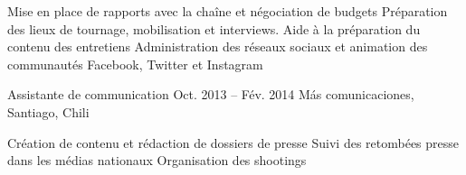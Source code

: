 \begin{joblist}
{		\iftbftiny \vspace{-0.5cm} \fi
			\begin{itemize}
			  \iftbftiny \setlength\itemsep{-3pt} \fi
			  \cvitem[\checkmark] Mise en place de rapports avec la chaîne et négociation de budgets                       
			  \cvitem[\checkmark] Préparation des lieux de tournage, mobilisation et interviews. Aide à la préparation du contenu des entretiens 
			  \cvitem[\checkmark] Administration des réseaux sociaux et animation des communautés Facebook, Twitter et Instagram                
			\end{itemize}     
			
	}



\item[Assistante de communication]{Oct. 2013 -- Fév. 2014 }     
  	{Más comunicaciones, Santiago, Chili}     
  	{

		\iftbftiny \vspace{-0.5cm} \fi
		\begin{itemize}
			  \iftbftiny \setlength\itemsep{-3pt} \fi
			  \cvitem[\checkmark]  Création de contenu et rédaction de dossiers de presse                                        
			  \cvitem[\checkmark]  Suivi des retombées presse dans les médias nationaux                                             
			  \cvitem[\checkmark]  Organisation des shootings

		\end{itemize}       
	}



   

\end{joblist}


